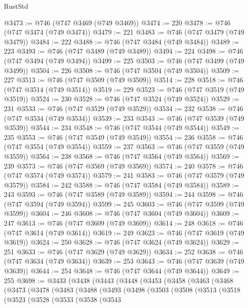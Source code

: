 \begin{lexlean}{RustStd}
\begin{coremodule}
{\begin{coremodule}
{{{{{{{{{{{{{{{{{{{{{{{{{{{{{{{{{{{{{{{{{{{{{{{{{{{{{{{{{{{{{{{{{{{{{{{{{{{{{{{{@3473 := @746 (@747 @3469 (@749 @3469))
@3474 := 220
@3478 := @746 (@747 @3474 (@749 @3474))
@3479 := 221
@3483 := @746 (@747 @3479 (@749 @3479))
@3484 := 222
@3488 := @746 (@747 @3484 (@749 @3484))
@3489 := 223
@3493 := @746 (@747 @3489 (@749 @3489))
@3494 := 224
@3498 := @746 (@747 @3494 (@749 @3494))
@3499 := 225
@3503 := @746 (@747 @3499 (@749 @3499))
@3504 := 226
@3508 := @746 (@747 @3504 (@749 @3504))
@3509 := 227
@3513 := @746 (@747 @3509 (@749 @3509))
@3514 := 228
@3518 := @746 (@747 @3514 (@749 @3514))
@3519 := 229
@3523 := @746 (@747 @3519 (@749 @3519))
@3524 := 230
@3528 := @746 (@747 @3524 (@749 @3524))
@3529 := 231
@3533 := @746 (@747 @3529 (@749 @3529))
@3534 := 232
@3538 := @746 (@747 @3534 (@749 @3534))
@3539 := 233
@3543 := @746 (@747 @3539 (@749 @3539))
@3544 := 234
@3548 := @746 (@747 @3544 (@749 @3544))
@3549 := 235
@3553 := @746 (@747 @3549 (@749 @3549))
@3554 := 236
@3558 := @746 (@747 @3554 (@749 @3554))
@3559 := 237
@3563 := @746 (@747 @3559 (@749 @3559))
@3564 := 238
@3568 := @746 (@747 @3564 (@749 @3564))
@3569 := 239
@3573 := @746 (@747 @3569 (@749 @3569))
@3574 := 240
@3578 := @746 (@747 @3574 (@749 @3574))
@3579 := 241
@3583 := @746 (@747 @3579 (@749 @3579))
@3584 := 242
@3588 := @746 (@747 @3584 (@749 @3584))
@3589 := 243
@3593 := @746 (@747 @3589 (@749 @3589))
@3594 := 244
@3598 := @746 (@747 @3594 (@749 @3594))
@3599 := 245
@3603 := @746 (@747 @3599 (@749 @3599))
@3604 := 246
@3608 := @746 (@747 @3604 (@749 @3604))
@3609 := 247
@3613 := @746 (@747 @3609 (@749 @3609))
@3614 := 248
@3618 := @746 (@747 @3614 (@749 @3614))
@3619 := 249
@3623 := @746 (@747 @3619 (@749 @3619))
@3624 := 250
@3628 := @746 (@747 @3624 (@749 @3624))
@3629 := 251
@3633 := @746 (@747 @3629 (@749 @3629))
@3634 := 252
@3638 := @746 (@747 @3634 (@749 @3634))
@3639 := 253
@3643 := @746 (@747 @3639 (@749 @3639))
@3644 := 254
@3648 := @746 (@747 @3644 (@749 @3644))
@3649 := 255
@3698 := @3433
    (@3438
      (@3443
        (@3448
          (@3453
            (@3458
              (@3463
                (@3468
                  (@3473
                    (@3478
                      (@3483
                        (@3488
                          (@3493
                            (@3498
                              (@3503
                                (@3508
                                  (@3513
                                    (@3518
                                      (@3523
                                        (@3528
                                          (@3533
                                            (@3538
                                              (@3543
}}}}}}}}}}}}}}}}}}}}}}}}}}}}}}}}}}}}}}}}}}}}}}}}}}}}}}}}}}}}}}}}}}}}}}}}}}}}}}}}
\end{coremodule}}
\end{coremodule}
\end{lexlean}
